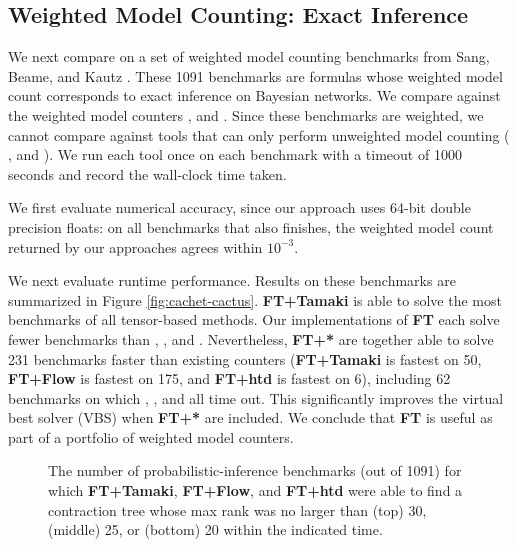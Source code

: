 \subsection{Weighted Model Counting: Exact Inference}
\label{sec:tensors:experiments:cachet}
We next compare on a set of weighted model counting benchmarks from Sang, Beame, and Kautz . These 1091 benchmarks are formulas whose weighted model count corresponds to exact inference on Bayesian networks. We compare against the weighted model counters  \cite{SBK05},  \cite{OD15} and  \cite{LM17}. Since these benchmarks are weighted, we cannot compare against tools that can only perform unweighted model counting ( \cite{CW16},  \cite{FHMW17} and  \cite{Thurley2006}). We run each tool once on each benchmark with a timeout of 1000 seconds and record the wall-clock time taken.

We first evaluate numerical accuracy, since our approach uses 64-bit double precision floats: on all benchmarks that  also finishes, the weighted model count returned by our approaches agrees within $10^{-3}$.

We next evaluate runtime performance. Results on these benchmarks are summarized in Figure \ref{fig:cachet-cactus}. \textbf{FT+Tamaki} is able to solve the most benchmarks of all tensor-based methods. Our implementations of \textbf{FT} each solve fewer benchmarks than , , and . Nevertheless, \textbf{FT+*} are together able to solve 231 benchmarks faster than existing counters (\textbf{FT+Tamaki} is fastest on 50, \textbf{FT+Flow} is fastest on 175, and \textbf{FT+htd} is fastest on 6), including 62 benchmarks on which , , and  all time out. This significantly improves the virtual best solver (VBS) when \textbf{FT+*} are included. We conclude that \textbf{FT} is useful as part of a portfolio of weighted model counters.


\begin{figure}
	\centering
	
	\caption{\label{fig:solver-analysis} The number of probabilistic-inference benchmarks (out of 1091) for which \textbf{FT+Tamaki}, \textbf{FT+Flow}, and \textbf{FT+htd} were able to find a contraction tree whose max rank was no larger than (top) 30, (middle) 25, or (bottom) 20 within the indicated time.}
\end{figure}

